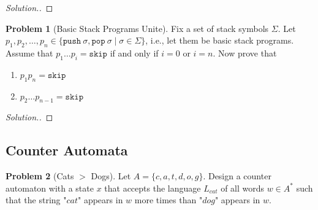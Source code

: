 \documentclass[11pt]{article}
\theoremstyle{theorem} %
\theoremstyle{definition} %
\newtheorem{problem}                    {{\color{BurntOrange}Problem}}
\theoremstyle{remark} %
\begin{document}
\begin{proof}
    [Solution.]
\end{proof}

\begin{problem}
    [Basic Stack Programs Unite]
    Fix a set of stack symbols \(\Sigma\).
    Let \(p_1,p_2,\dots, p_n \in \{\mathtt{push}~\sigma, \mathtt{pop}~\sigma \mid \sigma \in \Sigma\}\), i.e., let them be basic stack programs.
    Assume that \(p_1\dots p_i = \mathtt{skip}\) if and only if \(i = 0\) or \(i = n\). 
    Now prove that 
    \begin{enumerate}
        \item \(p_1 p_n = \mathtt{skip}\)
        \item \(p_2\dots p_{n-1} = \mathtt{skip}\)
    \end{enumerate}
\end{problem}

\begin{proof}
    [Solution.]
\end{proof}

\subsection*{Counter Automata}

\begin{problem}
    [Cats \(>\) Dogs]
    Let \(A = \{c, a, t, d, o, g\}\). 
    Design a counter automaton with a state \(x\) that accepts the language \(L_{cat}\) of all words \(w \in A^*\) such that the string "\(cat\)" appears in \(w\) more times than "\(dog\)" appears in \(w\).
\end{problem}
\end{document}
